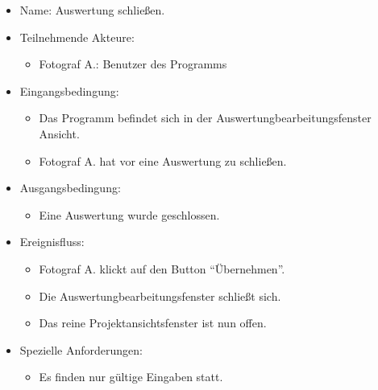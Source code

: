 \begin{itemize}
\item Name: Auswertung schließen.
\item Teilnehmende Akteure:
\begin{itemize}
\item Fotograf A.: Benutzer des Programms
\end{itemize}
\item Eingangsbedingung:
\begin{itemize}
\item Das Programm befindet sich in der Auswertungbearbeitungsfenster Ansicht.
\item Fotograf A. hat vor eine Auswertung zu schließen.
\end{itemize}
\item Ausgangsbedingung:
\begin{itemize}
\item Eine Auswertung wurde geschlossen.
\end{itemize}
\item Ereignisfluss:
\begin{itemize}
\item Fotograf A. klickt auf den Button "`Übernehmen"'.
\item Die Auswertungbearbeitungsfenster schließt sich.
\item Das reine Projektansichtsfenster ist nun offen.
\end{itemize}
\item Spezielle Anforderungen:
\begin{itemize}
\item Es finden nur gültige Eingaben statt.
\end{itemize}
\end{itemize}